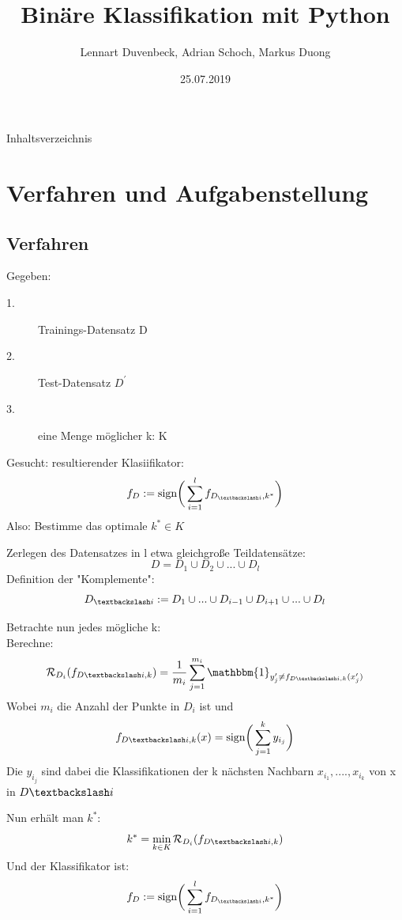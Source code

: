 \documentclass{beamer}
\title{Binäre Klassifikation mit Python}
\author{Lennart Duvenbeck, Adrian Schoch, Markus Duong}
\date{25.07.2019}
\begin{document}
\maketitle
\begin{frame}{Inhaltsverzeichnis}
  \tableofcontents
\end{frame}


\section{Verfahren und Aufgabenstellung}

\subsection{Verfahren}
\begin{frame}
Gegeben: 
\begin{description}
\item[1.] Trainings-Datensatz D
\item[2.] Test-Datensatz $D^{'}$
\item[3.] eine Menge möglicher k: K
\end{description}
Gesucht: resultierender Klasiifikator: 
\[
f_ {D} := \text{sign} \bigg( \sum_{i=1}^{l} f_{D_{\textbackslash i}, k^{*}}\bigg)
\]
Also: Bestimme das optimale $k^* \in K$
\end{frame}



\begin{frame}
Zerlegen des Datensatzes in l etwa gleichgroße Teildatensätze:
\[
D= D_1 \cup D_2 \cup ... \cup D_l
\]
Definition der "Komplemente":
\[
D_{\textbackslash i} := D_{1} \cup ... \cup D_{i-1} \cup D_{i+1} \cup...\cup D_{l}
\]
\end{frame}


\begin{frame}
Betrachte nun jedes mögliche k:\\
Berechne:
\[ \mathcal{R}_{D_i}(f_{D \textbackslash i ,k})= \frac{1}{m_i} \sum_{j=1}^{m_i} \mathbbm{1}_{y_{j}' \neq f_{D \textbackslash i ,k}(x_{j}')}
\]
Wobei $m_i$ die Anzahl der Punkte in $D_i$ ist und  
\[f_{D \textbackslash i ,k}(x) = \text{sign} \bigg( \sum_{j =1}^{k} y_{i_{j}}\bigg)
\]
Die $y_{i_j}$ sind dabei die Klassifikationen der k nächsten Nachbarn 
$x_{i_1},....,x_{i_k}$ von x in $D \textbackslash i$
\end{frame}

\begin{frame}
Nun erhält man $k^*$: 
\[k^* = \min \limits_{k \in K} \mathcal{R}_{D_i}(f_{D \textbackslash i ,k})
\]
Und der Klassifikator ist:
\[f_ {D} := \text{sign} \bigg( \sum_{i=1}^{l} f_{D_{\textbackslash i}, k^{*}}\bigg)
\]
\end{frame}
\end{document}

